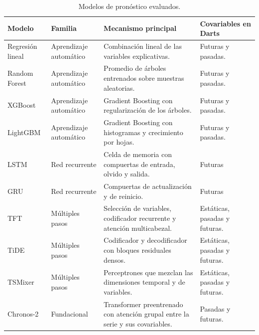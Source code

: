 \begin{table}[H]
	\centering
	\caption{Modelos de pronóstico evaluados.}
	\label{tab:modelos_familias}
	\footnotesize
	\setlength{\tabcolsep}{4pt}
	\renewcommand{\arraystretch}{1.15}
	\begin{tabularx}{\textwidth}{
			@{}
			>{\raggedright\arraybackslash\hsize=0.7\hsize}X
			>{\raggedright\arraybackslash\hsize=0.8\hsize}X
			>{\raggedright\arraybackslash\hsize=1.7\hsize}X
			>{\raggedright\arraybackslash\hsize=0.8\hsize}X
			@{}
		}
		\toprule
		\textbf{Modelo} & \textbf{Familia} & \textbf{Mecanismo principal} & \textbf{Covariables en Darts} \\
		\midrule
		Regresión lineal & Aprendizaje automático & Combinación lineal de las variables explicativas. & Futuras y pasadas. \\
		Random Forest \cite{breiman2001randomforest} & Aprendizaje automático & Promedio de árboles entrenados sobre muestras aleatorias. & Futuras y pasadas. \\
		XGBoost \cite{chen2016xgboost} & Aprendizaje automático & Gradient Boosting \cite{friedman2001gbm} con regularización de los árboles. & Futuras y pasadas. \\
		LightGBM \cite{ke2017lightgbm} & Aprendizaje automático & Gradient Boosting con histogramas y crecimiento por hojas. & Futuras y pasadas. \\
		LSTM \cite{hochreiter1997lstm} & Red recurrente & Celda de memoria con compuertas de entrada, olvido y salida. & Futuras \\
		GRU \cite{cho2014gru} & Red recurrente & Compuertas de actualización y de reinicio. & Futuras \\
		TFT \cite{lim2021tft} & Múltiples pasos & Selección de variables, codificador recurrente y atención multicabezal. & Estáticas, pasadas y futuras. \\
		TiDE \cite{das2023tide} & Múltiples pasos & Codificador y decodificador con bloques residuales densos. & Estáticas, pasadas y futuras. \\
		TSMixer \cite{chen2023tsmixer} & Múltiples pasos & Perceptrones que mezclan las dimensiones temporal y de variables. & Estáticas, pasadas y futuras. \\
		Chronos-2 \cite{ansari2025chronos2} & Fundacional & Transformer preentrenado con atención grupal entre la serie y sus covariables. & Pasadas y futuras. \\
		\bottomrule
	\end{tabularx}
\end{table}

